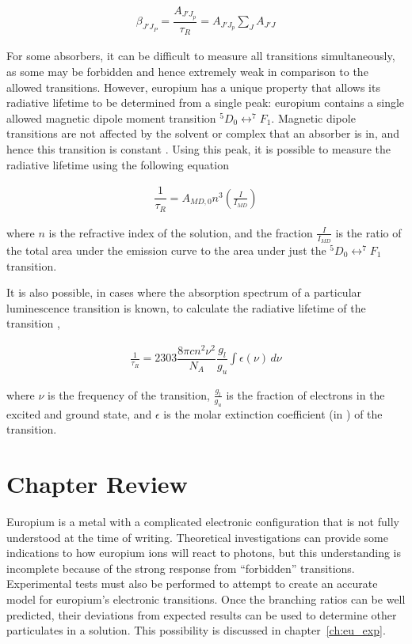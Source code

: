 \begin{align}
  \beta_{J'J_P} = \dfrac{A_{J'J_p}}{\tau_R} = A_{J'J_p}\sum_J A_{J'J} \label{eq:branch_ratio}
\end{align}

For some absorbers, it can be difficult to measure all transitions
simultaneously, as some may be forbidden and hence extremely weak in comparison
to the allowed transitions. However, europium has a unique property that allows
its radiative lifetime to be determined from a single peak: europium contains a
single allowed magnetic dipole moment transition $^5D_0 \leftrightarrow ^7F_1$.
Magnetic dipole transitions are not affected by the solvent or complex that an
absorber is in, and hence this transition is constant \cite{Werts:2002fs}.
Using this peak, it is possible to measure the radiative lifetime using the
following equation

\begin{align}
  \dfrac{1}{\tau_R} = A_{MD,0}n^3\left(\frac{I}{I_{MD}}\right) \label{eq:nat_life_eu}
\end{align}

where $n$ is the refractive index of the solution, and the fraction
$\frac{I}{I_{MD}}$ is the ratio of the total area under the emission curve to
the area under just the $^5D_0 \leftrightarrow ^7F_1$ transition.

It is also possible, in cases where the absorption spectrum of a particular
luminescence transition is known, to calculate the radiative lifetime of the
transition \cite{Lewis:1945tp},

\begin{align}
  \frac{1}{\tau_R} = 2303 \dfrac{8\pi c n ^2 \nu^2}{N_A}\dfrac{g_l}{g_u}\int\epsilon(\nu)\,d\nu \label{eq:nat_life_abs}
\end{align}

where $\nu$ is the frequency of the transition, $\tfrac{g_l}{g_u}$ is the
fraction of electrons in the excited and ground state, and $\epsilon$ is the
molar extinction coefficient (in \iM\icm) of the transition.

\section*{Chapter Review}

Europium is a metal with a complicated electronic configuration that is not
fully understood at the time of writing. Theoretical investigations can
provide some indications to how europium ions will react to photons, but this
understanding is incomplete because of the strong response from ``forbidden''
transitions. Experimental tests must also be performed to attempt to create
an accurate model for europium's electronic transitions. Once the branching
ratios can be well predicted, their deviations from expected results can
be used to determine other particulates in a solution. This possibility is
discussed in chapter~\ref{ch:eu_exp}.
